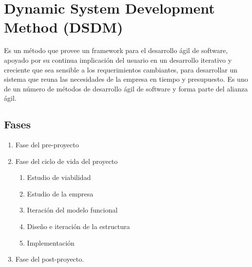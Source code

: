 \documentclass{article}
\begin{document}
\section{Dynamic System Development Method (DSDM)}
Es un método que provee un framework para el desarrollo ágil de software, apoyado por su continua implicación del usuario en un desarrollo iterativo y creciente que sea sensible a los requerimientos cambiantes, para desarrollar un sistema que reuna las necesidades de la empresa en tiempo y presupuesto. Es uno de un número de métodos de desarrollo ágil de software y forma parte del alianza ágil.
	\subsection{Fases}
	\begin{enumerate}
		\item Fase del pre-proyecto
		\item Fase del ciclo de vida del proyecto
			\begin{enumerate}
				\item Estudio de viabilidad
				\item Estudio de la empresa
				\item Iteración del modelo funcional
				\item Diseño e iteración de la estructura
				\item Implementación
			\end{enumerate}
		\item Fase del post-proyecto.
	\end{enumerate}
\end{document}
